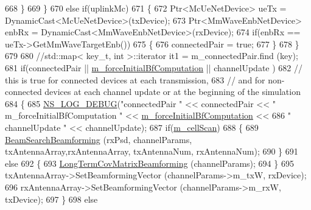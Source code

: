 \begin{DoxyCode}
668                         \}       
669                 \}
670                 \textcolor{keywordflow}{else} \textcolor{keywordflow}{if}(uplinkMc)
671                 \{
672                         Ptr<McUeNetDevice> ueTx = DynamicCast<McUeNetDevice>(txDevice);
673                         Ptr<MmWaveEnbNetDevice> enbRx = DynamicCast<MmWaveEnbNetDevice>(rxDevice);
674                         \textcolor{keywordflow}{if}(enbRx == ueTx->GetMmWaveTargetEnb())
675                         \{
676                                 connectedPair = \textcolor{keyword}{true};
677                         \}       
678                 \}
679 
680                 \textcolor{comment}{//std::map< key\_t, int >::iterator it1 = m\_connectedPair.find (key);}
681                 \textcolor{keywordflow}{if}(connectedPair || \hyperlink{classns3_1_1MmWave3gppChannel_a2d5a32e24f0d795c5ed210f8c38f4e9b}{m\_forceInitialBfComputation} || channelUpdate
      )
682                 \textcolor{comment}{// this is true for connected devices at each transmission,}
683                 \textcolor{comment}{// and for non-connected devices at each channel update or at the beginning of the
       simulation}
684                 \{
685                         \hyperlink{group__logging_ga413f1886406d49f59a6a0a89b77b4d0a}{NS\_LOG\_DEBUG}(\textcolor{stringliteral}{"connectedPair "} << connectedPair << \textcolor{stringliteral}{"
       m\_forceInitialBfComputation "} << \hyperlink{classns3_1_1MmWave3gppChannel_a2d5a32e24f0d795c5ed210f8c38f4e9b}{m\_forceInitialBfComputation} << 
686                                 \textcolor{stringliteral}{" channelUpdate "} << channelUpdate);
687                         \textcolor{keywordflow}{if}(\hyperlink{classns3_1_1MmWave3gppChannel_ac973f52321b6843ce42f036620af63e8}{m\_cellScan})
688                         \{
689                                 \hyperlink{classns3_1_1MmWave3gppChannel_ac361c14154934a6e7633a0a8c561e788}{BeamSearchBeamforming} (rxPsd, channelParams,
      txAntennaArray,rxAntennaArray, txAntennaNum, rxAntennaNum);
690                         \}
691                         \textcolor{keywordflow}{else}
692                         \{
693                                 \hyperlink{classns3_1_1MmWave3gppChannel_a1ef519a7796d45ef5270e465664fd1bb}{LongTermCovMatrixBeamforming} (channelParams);
694                         \}
695                         txAntennaArray->SetBeamformingVector (channelParams->m\_txW, rxDevice);
696                         rxAntennaArray->SetBeamformingVector (channelParams->m\_rxW, txDevice);
697                 \}
698                 \textcolor{keywordflow}{else}

\end{DoxyCode}
